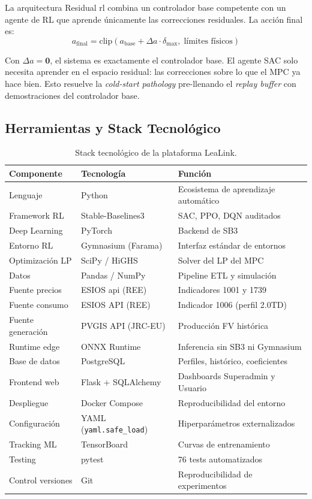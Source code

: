 \documentclass[12pt, a4paper, twoside]{report}
\begin{document}
La arquitectura Residual \acrshort{rl} \citep{Johannink2019} combina un
controlador base competente con un agente de RL que aprende únicamente las
correcciones residuales. La acción final es:
\begin{equation}
  a_{\text{final}} = \text{clip}\!\left(
    a_{\text{base}} + \Delta a \cdot \delta_{\max},\;
    \text{límites físicos}
  \right)
  \label{eq:residual_general}
\end{equation}

Con $\Delta a = \mathbf{0}$, el sistema es exactamente el controlador base.
El agente SAC solo necesita aprender en el espacio residual: las correcciones
sobre lo que el MPC ya hace bien. Esto resuelve la \textit{cold-start pathology}
pre-llenando el \textit{replay buffer} con demostraciones del controlador base.

\subsection{Herramientas y Stack Tecnológico}
\label{sub:herramientas}

\begin{table}[H]
\centering
\caption{Stack tecnológico de la plataforma LeaLink.}
\label{tab:stack}
\begin{tabularx}{\textwidth}{llX}
\toprule
\textbf{Componente} & \textbf{Tecnología} & \textbf{Función} \\
\midrule
Lenguaje & Python & Ecosistema de aprendizaje automático \\
Framework RL & Stable-Baselines3 & SAC, PPO, DQN auditados \\
Deep Learning & PyTorch & Backend de SB3 \\
Entorno RL & Gymnasium (Farama) & Interfaz estándar de entornos \\
Optimización LP & SciPy / HiGHS & Solver del LP del MPC \\
Datos & Pandas / NumPy & Pipeline ETL y simulación \\
Fuente precios & ESIOS \acrshort{api} (REE) & Indicadores 1001 y 1739 \\
Fuente consumo & ESIOS API (REE) & Indicador 1006 (perfil 2.0TD) \\
Fuente generación & PVGIS API (JRC-EU) & Producción FV histórica \\
Runtime edge & ONNX Runtime & Inferencia sin SB3 ni Gymnasium \\
Base de datos & PostgreSQL & Perfiles, histórico, coeficientes \\
Frontend web & Flask + SQLAlchemy & Dashboards Superadmin y Usuario \\
Despliegue & Docker Compose & Reproducibilidad del entorno \\
Configuración & YAML (\texttt{yaml.safe\_load}) & Hiperparámetros externalizados \\
Tracking ML & TensorBoard & Curvas de entrenamiento \\
Testing & pytest & 76 tests automatizados \\
Control versiones & Git & Reproducibilidad de experimentos \\
\bottomrule
\end{tabularx}
\end{table}
\end{document}
